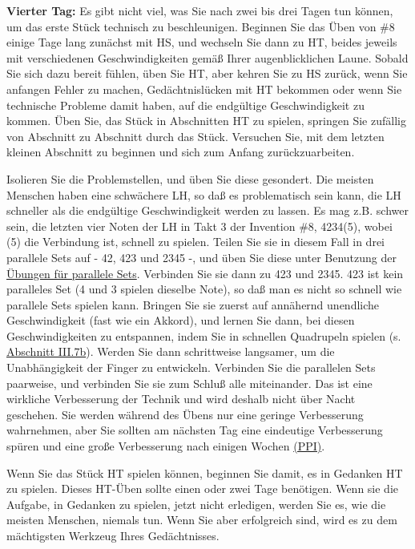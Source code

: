 \textbf{Vierter Tag:} Es gibt nicht viel, was Sie nach zwei bis drei Tagen tun können, um das erste Stück technisch zu beschleunigen.
Beginnen Sie das Üben von \#8 einige Tage lang zunächst mit HS, und wechseln Sie dann zu HT, beides jeweils mit verschiedenen Geschwindigkeiten gemäß Ihrer augenblicklichen Laune.
Sobald Sie sich dazu bereit fühlen, üben Sie HT, aber kehren Sie zu HS zurück, wenn Sie anfangen Fehler zu machen, Gedächtnislücken mit HT bekommen oder wenn Sie technische Probleme damit haben, auf die endgültige Geschwindigkeit zu kommen.
Üben Sie, das Stück in Abschnitten HT zu spielen, springen Sie zufällig von Abschnitt zu Abschnitt durch das Stück.
Versuchen Sie, mit dem letzten kleinen Abschnitt zu beginnen und sich zum Anfang zurückzuarbeiten.

Isolieren Sie die Problemstellen, und üben Sie diese gesondert.
Die meisten Menschen haben eine schwächere LH, so daß es problematisch sein kann, die LH schneller als die endgültige Geschwindigkeit werden zu lassen.
Es mag z.B. schwer sein, die letzten vier Noten der LH in Takt 3 der Invention \#8, 4234(5), wobei (5) die Verbindung ist, schnell zu spielen.
Teilen Sie sie in diesem Fall in drei parallele Sets auf - 42, 423 und 2345 -, und üben Sie diese unter Benutzung der \hyperref[c1iii7b]{Übungen für parallele Sets}.
Verbinden Sie sie dann zu 423 und 2345.
423 ist kein paralleles Set (4 und 3 spielen dieselbe Note), so daß man es nicht so schnell wie parallele Sets spielen kann.
Bringen Sie sie zuerst auf annähernd unendliche Geschwindigkeit (fast wie ein Akkord), und lernen Sie dann, bei diesen Geschwindigkeiten zu entspannen, indem Sie in schnellen Quadrupeln spielen (s. \hyperref[c1iii7b1]{Abschnitt III.7b}).
Werden Sie dann schrittweise langsamer, um die Unabhängigkeit der Finger zu entwickeln.
Verbinden Sie die parallelen Sets paarweise, und verbinden Sie sie zum Schluß alle miteinander.
Das ist eine wirkliche Verbesserung der Technik und wird deshalb nicht über Nacht geschehen.
Sie werden während des Übens nur eine geringe Verbesserung wahrnehmen, aber Sie sollten am nächsten Tag eine eindeutige Verbesserung spüren und eine große Verbesserung nach einigen Wochen \hyperref[c1ii15]{(PPI)}.

Wenn Sie das Stück HT spielen können, beginnen Sie damit, es in Gedanken HT zu spielen.
Dieses HT-Üben sollte einen oder zwei Tage benötigen.
Wenn sie die Aufgabe, in Gedanken zu spielen, jetzt nicht erledigen, werden Sie es, wie die meisten Menschen, niemals tun.
Wenn Sie aber erfolgreich sind, wird es zu dem mächtigsten Werkzeug Ihres Gedächtnisses.

